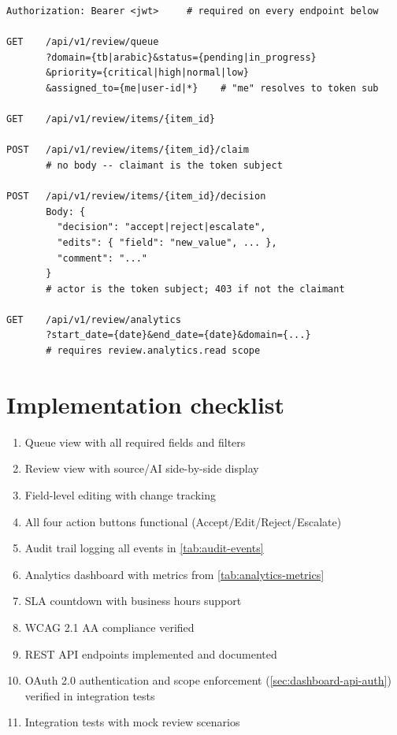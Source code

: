 \begin{lstlisting}[basicstyle=\ttfamily\small,caption={Review dashboard API endpoints (auth header required on all).}]
Authorization: Bearer <jwt>     # required on every endpoint below

GET    /api/v1/review/queue
       ?domain={tb|arabic}&status={pending|in_progress}
       &priority={critical|high|normal|low}
       &assigned_to={me|user-id|*}    # "me" resolves to token sub

GET    /api/v1/review/items/{item_id}

POST   /api/v1/review/items/{item_id}/claim
       # no body -- claimant is the token subject

POST   /api/v1/review/items/{item_id}/decision
       Body: {
         "decision": "accept|reject|escalate",
         "edits": { "field": "new_value", ... },
         "comment": "..."
       }
       # actor is the token subject; 403 if not the claimant

GET    /api/v1/review/analytics
       ?start_date={date}&end_date={date}&domain={...}
       # requires review.analytics.read scope
\end{lstlisting}

\section{Implementation checklist}

\begin{enumerate}
  \item[$\square$] Queue view with all required fields and filters
  \item[$\square$] Review view with source/AI side-by-side display
  \item[$\square$] Field-level editing with change tracking
  \item[$\square$] All four action buttons functional (Accept/Edit/Reject/Escalate)
  \item[$\square$] Audit trail logging all events in \cref{tab:audit-events}
  \item[$\square$] Analytics dashboard with metrics from \cref{tab:analytics-metrics}
  \item[$\square$] SLA countdown with business hours support
  \item[$\square$] WCAG 2.1 AA compliance verified
  \item[$\square$] REST API endpoints implemented and documented
  \item[$\square$] OAuth 2.0 authentication and scope enforcement
        (\cref{sec:dashboard-api-auth}) verified in integration tests
  \item[$\square$] Integration tests with mock review scenarios
\end{enumerate}